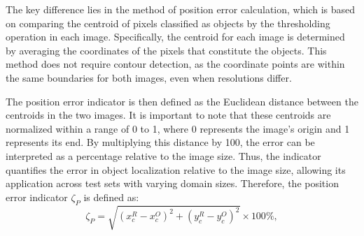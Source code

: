 \documentclass{IEEEtran}
\begin{document}

            The key difference lies in the method of position error calculation, which is based on comparing the centroid of pixels classified as objects by the thresholding operation in each image. Specifically, the centroid for each image is determined by averaging the coordinates of the pixels that constitute the objects. This method does not require contour detection, as the coordinate points are within the same boundaries for both images, even when resolutions differ.


            The position error indicator is then defined as the Euclidean distance between the centroids in the two images. It is important to note that these centroids are normalized within a range of 0 to 1, where 0 represents the image's origin and 1 represents its end. By multiplying this distance by 100, the error can be interpreted as a percentage relative to the image size. Thus, the indicator quantifies the error in object localization relative to the image size, allowing its application across test sets with varying domain sizes. Therefore, the position error indicator $\zeta_P$ is defined as:
            \begin{equation}
                \zeta_P = \sqrt{(x_c^R - x_c^O)^2 + (y_c^R-y_c^O)^2} \times 100\%, \label{eq:positionerror}
            \end{equation}
\end{document}
